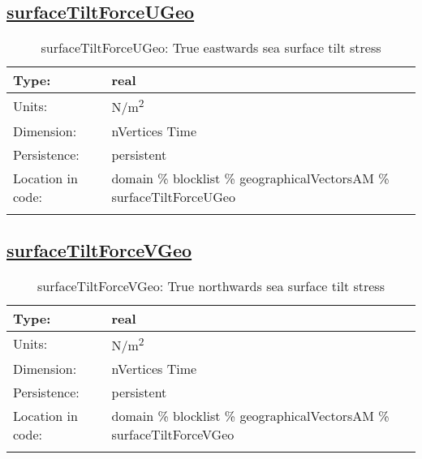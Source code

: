 \subsection[surfaceTiltForceUGeo]{\hyperref[sec:var_tab_geographicalVectorsAM]{surfaceTiltForceUGeo}}
\label{subsec:var_sec_geographicalVectorsAM_surfaceTiltForceUGeo}
\begin{center}
\begin{longtable}{| p{2.0in} | p{4.0in} |}
        \hline 
        Type: & real \\
        \hline 
        Units: & \si{N/m^2} \\
        \hline 
        Dimension: & nVertices Time \\
        \hline 
        Persistence: & persistent \\
        \hline 
         Location in code: & domain \% blocklist \% geographicalVectorsAM \% surfaceTiltForceUGeo \\
         \hline 
    \caption{surfaceTiltForceUGeo: True eastwards sea surface tilt stress}
\end{longtable}
\end{center}
\subsection[surfaceTiltForceVGeo]{\hyperref[sec:var_tab_geographicalVectorsAM]{surfaceTiltForceVGeo}}
\label{subsec:var_sec_geographicalVectorsAM_surfaceTiltForceVGeo}
\begin{center}
\begin{longtable}{| p{2.0in} | p{4.0in} |}
        \hline 
        Type: & real \\
        \hline 
        Units: & \si{N/m^2} \\
        \hline 
        Dimension: & nVertices Time \\
        \hline 
        Persistence: & persistent \\
        \hline 
         Location in code: & domain \% blocklist \% geographicalVectorsAM \% surfaceTiltForceVGeo \\
         \hline 
    \caption{surfaceTiltForceVGeo: True northwards sea surface tilt stress}
\end{longtable}
\end{center}
